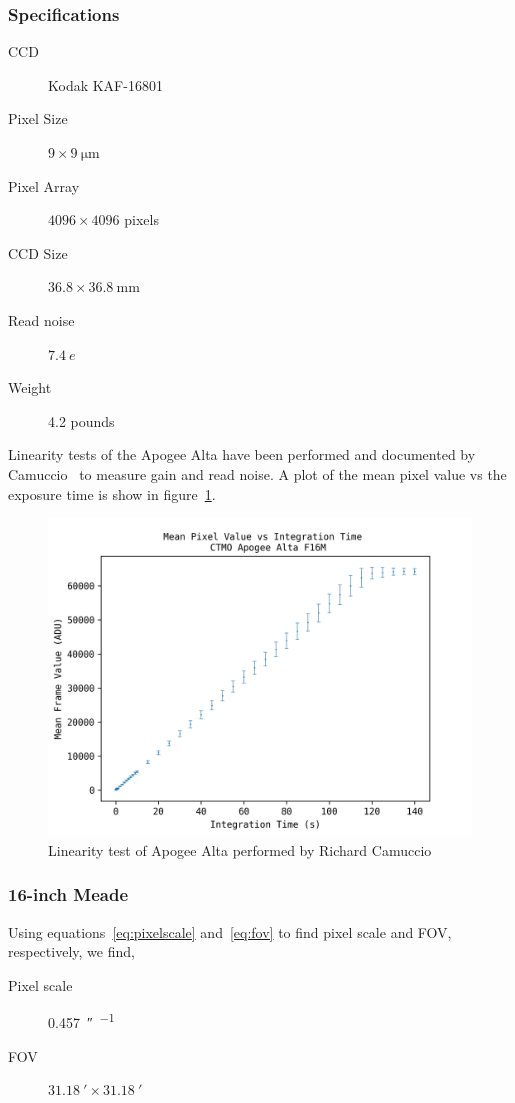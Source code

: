 \subsubsection{Specifications}
\begin{description}
    \item[CCD] Kodak KAF-16801
    \item[Pixel Size] $9 \times \SI{9}{\micro\meter}$
    \item[Pixel Array] $4096 \times 4096$ pixels
    \item[CCD Size] $36.8 \times \SI{36.8}{\milli\meter}$
    \item[Read noise] $\SI{7.4}{\elementarycharge}$
    \item[Weight] 4.2 pounds
\end{description}
Linearity tests of the Apogee Alta have been performed and documented by Camuccio~\cite{richard_2019a} to measure gain and read noise.
A plot of the mean pixel value vs the exposure time is show in figure~\ref{fig:linearityapogee}.
\begin{figure}[h]
    \centering
    \includegraphics[width=\columnwidth]{figures/apogee_linearity.png}
    \caption{Linearity test of Apogee Alta performed by Richard Camuccio~\protect\cite{richard_2019a}}
\label{fig:linearityapogee}
\end{figure}


\subsubsection{16-inch Meade}
Using equations~\ref{eq:pixelscale} and~\ref{eq:fov} to find pixel scale and FOV, respectively, we find, 
\begin{description}
    \item[Pixel scale] \SI{0.457}{\arcsecond\per{}}
    \item[FOV] $\SI{31.18}{\arcminute} \times \SI{31.18}{\arcminute}$
\end{description}

